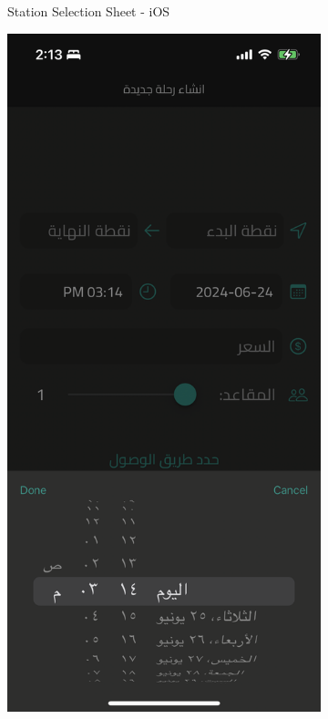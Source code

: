 \documentclass[a4paper, 12pt]{report} %
\begin{document}
\begin{figure}[H]
\begin{subfigure}{0.3\textwidth}
                    \caption{Station Selection Sheet - iOS}
                    \label{fig:trip_cration_1}
                \end{subfigure}
                \begin{subfigure}{0.3\textwidth}
                    \includegraphics[width=\linewidth]{Images/trip_creation_2.png}

\end{subfigure}
\end{figure}
\end{document}
